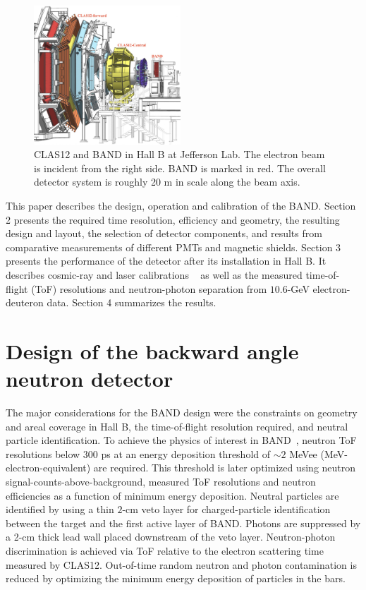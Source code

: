 \documentclass[3p,twocolumn]{elsarticle}
\begin{document}
\begin{figure}[t!]
	\centering
	\includegraphics[width=0.49\textwidth]{BandInClas.jpg}
        \caption{CLAS12 and BAND in Hall B at Jefferson Lab. The
          electron beam is incident from the right side. BAND is
          marked in red. The overall detector system is roughly 20
          \si{\meter} in scale along the beam axis. }
		\label{fig:clas12band}
\end{figure}
This paper describes the design, operation and calibration of the BAND.
Section 2 presents the required time resolution, efficiency and
geometry, the resulting design and layout, the selection of detector
components, and results from comparative measurements of different
PMTs and magnetic shields. Section 3 presents the performance of the
detector after its installation in Hall B. It describes cosmic-ray and
laser calibrations ~\cite{band-laser} as well as the measured
time-of-flight (ToF) resolutions and neutron-photon separation from
$10.6$-\si{\GeV} electron-deuteron data. Section 4 summarizes the
results.




\section{Design of the backward angle neutron detector}
The major considerations for the BAND design were the constraints on
geometry and areal coverage in Hall B, the time-of-flight resolution
required, and neutral particle identification.  To achieve the physics
of interest in BAND~\cite{band-proposal}, neutron ToF
resolutions below $300$ \si{\pico\second} at an energy deposition
threshold of $\sim 2$ MeVee (MeV-electron-equivalent) are required. 
This threshold is later optimized using neutron signal-counts-above-background,
measured ToF resolutions and neutron efficiencies as a function of minimum energy deposition.
Neutral particles are
identified by using a thin $2$-\si{\centi\meter} veto layer for
charged-particle identification between the target and the first
active layer of BAND. Photons are suppressed by a 2-\si{\centi\meter}
thick lead wall placed downstream of the veto layer. Neutron-photon
discrimination is achieved via ToF relative to the electron scattering
time measured by CLAS12. Out-of-time random neutron and photon
contamination is reduced by optimizing the minimum energy deposition of particles in the bars.
\end{document}
